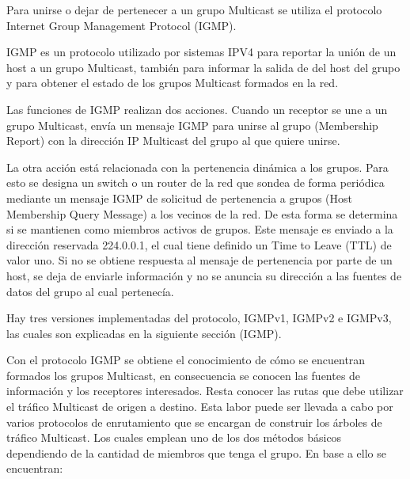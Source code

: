 \documentclass[12pt,a4paper,oneside]{book}
\begin{document}
Para unirse o dejar de pertenecer a un grupo Multicast se utiliza el protocolo Internet Group Management Protocol (IGMP). 

\vspace{0.5cm}

IGMP es un protocolo utilizado por sistemas IPV4 para reportar la unión de un host a un grupo Multicast, también para informar la salida de del host del grupo y para obtener el estado de los grupos Multicast formados en la red.

\vspace{0.5cm}

Las funciones de IGMP realizan dos acciones. Cuando un receptor se une a un grupo Multicast, envía un mensaje IGMP para unirse al grupo (Membership Report) con la dirección IP Multicast del grupo al que quiere unirse.

\vspace{0.5cm}

La otra acción está relacionada con la pertenencia dinámica a los grupos. Para esto se designa un switch o un router de la red que sondea de forma periódica mediante un mensaje IGMP de solicitud de pertenencia a grupos (Host Membership Query Message) a los vecinos de la red. De esta forma se determina si se mantienen como miembros activos de grupos. Este mensaje es enviado a la dirección reservada 224.0.0.1, el cual tiene definido un Time to Leave (TTL) de valor uno. Si no se obtiene respuesta al mensaje de pertenencia por parte de un host, se deja de enviarle información y no se anuncia su dirección a las fuentes de datos del grupo al cual pertenecía. 

\vspace{0.5cm}

Hay tres versiones implementadas del protocolo, IGMPv1, IGMPv2 e IGMPv3, las cuales son explicadas en la siguiente sección (IGMP).

\vspace{0.5cm}

Con el protocolo IGMP se obtiene el conocimiento de cómo se encuentran formados los grupos Multicast, en consecuencia se conocen las fuentes de información y los receptores interesados. Resta conocer las rutas que debe utilizar el tráfico Multicast de origen a destino. Esta labor puede ser llevada a cabo por varios protocolos de enrutamiento que se encargan de construir los árboles de tráfico Multicast. Los cuales emplean  uno de los dos métodos básicos dependiendo de la cantidad de miembros que tenga el grupo. En base a ello se encuentran:
\end{document}
